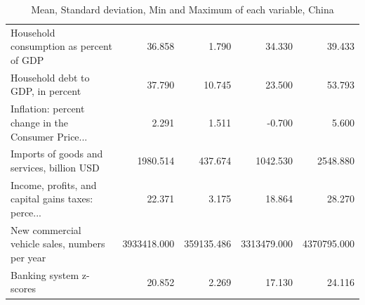 \documentclass[11pt]{article}
\begin{document}
\begin{table}[H]
\begin{tabular}{lrrrr}
Household consumption as percent of GDP            &       36.858 &       1.790 &       34.330 &       39.433 \\
Household debt to GDP, in percent                  &       37.790 &      10.745 &       23.500 &       53.793 \\
Inflation: percent change in the Consumer Price... &        2.291 &       1.511 &       -0.700 &        5.600 \\
Imports of goods and services, billion USD         &     1980.514 &     437.674 &     1042.530 &     2548.880 \\
Income, profits, and capital gains taxes: perce... &       22.371 &       3.175 &       18.864 &       28.270 \\
New commercial vehicle sales, numbers per year     &  3933418.000 &  359135.486 &  3313479.000 &  4370795.000 \\
Banking system z-scores                            &       20.852 &       2.269 &       17.130 &       24.116 \\
\bottomrule
\end{tabular}
\caption{Mean, Standard deviation, Min and Maximum of each variable, China}
\label{tab:describe_chn}
\end{table}
\end{document}
